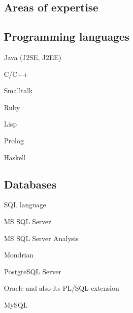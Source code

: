 \documentclass[czech]{article}
\renewenvironment{itemize}{
  \begin{list}{}{
    \setlength{\leftmargin}{1.5em}
  }
}{
  \end{list}
}
\begin{document}
\textcolor{coolblack}{\section*{Areas of expertise}}
\begin{multicols}{2} 
\textcolor{coffee}{\subsection*{Programming languages}}

\begin{itemize}
\item Java (J2SE, J2EE)
\item C/C++
\item Smalltalk
\item Ruby
\item Lisp
\item Prolog
\item Haskell
\end{itemize}


\textcolor{coffee}{\subsection*{Databases}}

\begin{itemize}
\item SQL language
\item MS SQL Server
\item MS SQL Server Analysis
\item Mondrian
\item PostgreSQL Server
\item Oracle and also its PL/SQL extension
\item MySQL
\end{itemize}
\end{multicols}
\end{document}
